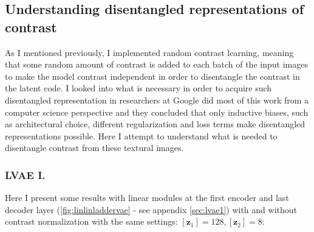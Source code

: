 \documentclass[12pt, english]{article}
\begin{document}
\vspace{7mm}

\subsection{Understanding disentangled representations of contrast}

\vspace{5mm}

\par As I mentioned previously, I implemented random contrast learning, meaning that some random amount of contrast is added to each batch of the input images to make the model contrast independent in order to disentangle the contrast in the latent code. I looked into what is necessary in order to acquire such disentangled representation in \cite{locatello2018challenging} researchers at Google did most of this work from a computer science perspective and they concluded that only inductive biases, such as architectural choice, different regularization and loss terms make disentangled representations possible. Here I attempt to understand what is needed to disentangle contrast from these textural images.

\vspace{4mm}

\subsubsection{LVAE I.}

\vspace{4mm}

\par Here I present some results with linear modules at the first encoder and last decoder layer (\ref{fig:linlinladdervae} - see appendix \ref{sec:lvae1}) with and without contrast normalization with the same settings: $[\bm{z}_{1}] = 128, [\bm{z}_{2}] = 8$:

\vspace{4mm}
\end{document}
